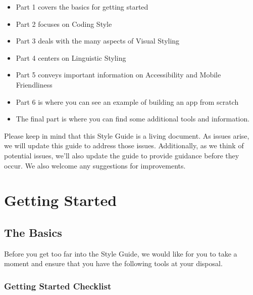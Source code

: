 \documentclass[
]{book}
\providecommand{\tightlist}{%
  \setlength{\itemsep}{0pt}\setlength{\parskip}{0pt}}
\begin{document}
\begin{itemize}
\tightlist
\item
  Part 1 covers the basics for getting started
\item
  Part 2 focuses on Coding Style
\item
  Part 3 deals with the many aspects of Visual Styling
\item
  Part 4 centers on Linguistic Styling
\item
  Part 5 conveys important information on Accessibility and Mobile Friendliness
\item
  Part 6 is where you can see an example of building an app from scratch
\item
  The final part is where you can find some additional tools and information.
\end{itemize}

Please keep in mind that this Style Guide is a living document. As issues arise, we will update this guide to address those issues. Additionally, as we think of potential issues, we'll also update the guide to provide guidance before they occur. We also welcome any suggestions for improvements.

\hypertarget{part-getting-started}{%
\part{Getting Started}\label{part-getting-started}}

\setcounter{chapter}{0}

\hypertarget{basics}{%
\chapter{The Basics}\label{basics}}

Before you get too far into the Style Guide, we would like for you to take a moment and ensure that you have the following tools at your disposal.

\hypertarget{checklist}{%
\section{Getting Started Checklist}\label{checklist}}
\end{document}
